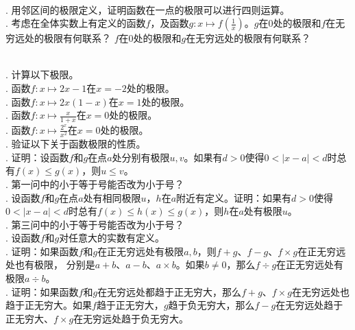 \documentclass[12pt,UTF8,fontset=none]{ctexbook}
\begin{document}

\begin{sk}
    \mbox{} \\
    . 用邻区间的极限定义，证明函数在一点的极限可以进行四则运算。\\
    . 考虑在全体实数上有定义的函数$f$，及函数$g:x\mapsto f\left(\frac{1}{x}\right)$。$g$在$0$处的极限和$f$在无穷远处的极限有何联系？
    $f$在$0$处的极限和$g$在无穷远处的极限有何联系？
\end{sk}

\begin{xt}
    \mbox{} \\
    . 计算以下极限。\\
    . 函数$f:x\mapsto 2x - 1$在$x = -2$处的极限。\\
    . 函数$f:x\mapsto 2x(1 - x)$在$x = 1$处的极限。\\
    . 函数$f:x\mapsto \displaystyle\frac{x}{1 + x}$在$x = 0$处的极限。\\
    . 函数$f:x\mapsto \displaystyle\frac{2^x}{x^2}$在$x = 0$处的极限。\\
    . 验证以下关于函数极限的性质。\\
    . 证明：设函数$f$和$g$在点$a$处分别有极限$u,v$。如果有$d>0$使得$0<|x-a|<d$时总有$f(x)\leqslant g(x)$，则$u \leqslant v$。\\
    . 第一问中的小于等于号能否改为小于号？\\
    . 设函数$f$和$g$在点$a$处有相同极限$u$，$h$在$a$附近有定义。证明：如果有$d>0$使得$0<|x-a|<d$时总有$f(x)\leqslant h(x) \leqslant g(x)$，则$h$在$a$处有极限$u$。\\ . 第三问中的小于等于号能否改为小于号？\\
    . 设函数$f$和$g$对任意大的实数有定义。\\
    . 证明：如果函数$f$和$g$在正无穷远处有极限$a, b$，则$f + g$、$f - g$、$f \times g$在正无穷远处也有极限，
    分别是$a + b$、$a - b$、$a \times b$。如果$b\neq 0$，那么$f \div g$在正无穷远处有极限$a \div b$。\\
    . 证明：如果函数$f$和$g$在无穷远处都趋于正无穷大，那么$f + g$、$f \times g$在无穷远处也趋于正无穷大。如果$f$趋于正无穷大，$g$趋于负无穷大，那么$f - g$在无穷远处趋于正无穷大、$f \times g$在无穷远处趋于负无穷大。\\

\end{xt}
\end{document}
